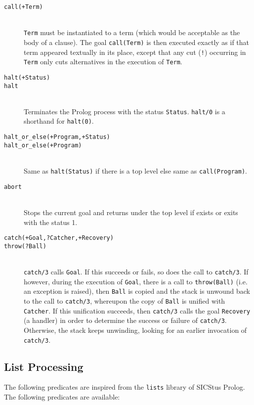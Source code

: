 \begin{description}
\item [{\tt call(+Term)}]~\\
	{\tt Term} must be instantiated to a term (which would be
	acceptable as the body of a clause). The goal {\tt call(Term)} is
	then  executed exactly as if that term appeared textually in
	its place, except that any cut ({\tt !}) occurring in {\tt
	Term} only cuts alternatives in the execution of {\tt Term}. 

\item [{\tt halt(+Status)}]
\item [{\tt halt}]~\\
	Terminates the Prolog process with the status {\tt Status}.
	{\tt halt/0} is a shorthand for {\tt halt(0)}.

\item [{\tt halt\_or\_else(+Program,+Status)}]
\item [{\tt halt\_or\_else(+Program)}]~\\
	Same as {\tt halt(Status)} if there is a top level else
	same as {\tt call(Program)}.


\item [{\tt abort}]~\\
	Stops the current goal and returns under the top level
	if exists or exits with the status 1.

\item [{\tt catch(+Goal,?Catcher,+Recovery)}]
\item [{\tt throw(?Ball)}]~\\
	{\tt catch/3} calls {\tt Goal}.  If this succeeds or 
	fails, so does the call to {\tt catch/3}.  If however, during
	the execution of {\tt Goal}, there is a call to 
	{\tt throw(Ball)} (i.e. an exception is raised), 
	then {\tt Ball} is copied and the stack is
	unwound back to the call to {\tt catch/3}, whereupon the copy
	of {\tt Ball} is unified with {\tt Catcher}.  If this
	unification succeeds, then {\tt catch/3} calls the goal 
	{\tt Recovery} (a handler) in order to determine the success
	or failure of {\tt catch/3}.  Otherwise, the stack keeps
	unwinding, looking for an earlier invocation of {\tt catch/3}. 


\end{description}


\subsection{List Processing}

The following predicates are inspired from the {\tt lists} library of
SICStus Prolog. The following predicates are available:\\

